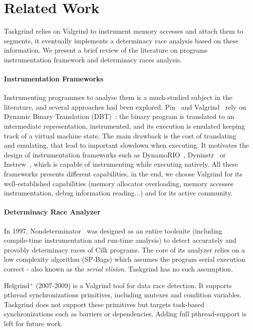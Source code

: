 
\section{Related Work} \label{sec:relworks}
Taskgrind relies on Valgrind to instrument memory accesses and attach them to segments, it eventually implements a determinacy race analysis based on these information.
We present a brief review of the literature on programs instrumentation framework and determinacy races analysis.

\paragraph{Instrumentation Frameworks}
Instrumenting programmes to analyse them is a much-studied subject in the literature, and several approaches had been explored.
Pin~\cite{pin} and Valgrind~\cite{valgrind} rely on Dynamic Binary Translation (DBT)~\cite{dbt}: the binary program is translated to an intermediate representation, instrumented, and its execution is emulated keeping track of a virtual machine state.
The main drawback is the cost of translating and emulating, that lead to important slowdown when executing.
It motivates the design of instrumentation frameworks such as DynamoRIO~\cite{dynamorio}, Dyninstr~\cite{dyninstr} or Instrew~\cite{llvm-dbi}, which is capable of instrumenting while executing natively.
All these frameworks presents different capabilities, in the end, we choose Valgrind for its well-established capabilities (memory allocator overloading, memory accesses instrumentation, debug information reading...) and for its active community.

\paragraph{Determinacy Race Analyzer}
In 1997, Nondeterminator~\cite{nondeterminator} was designed as an entire toolsuite (including compile-time instrumentation and run-time analysis) to detect accurately and provably determinacy races of Cilk programs.
The core of its analyzer relies on a low complexity algorithm (SP-Bags) which assumes the program serial execution correct - also known as the \emph{serial elision}.
Taskgrind has no such assumption.

Helgrind$^{+}$ (2007-2009) is a Valgrind tool for data race detection.
It supports pthread synchronizations primitives, including mutexes and condition variables.
Taskgrind does not support these primitives but targets task-based synchronizations such as barriers or dependencies.
Adding full pthread-support is left for future work.

